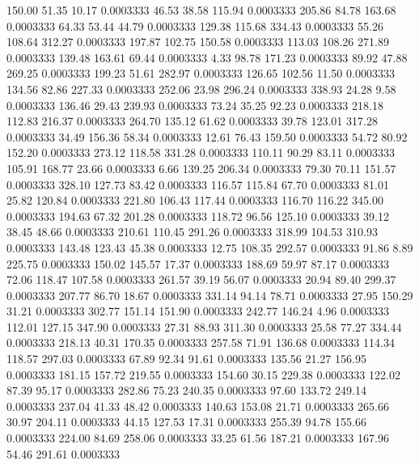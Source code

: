 150.00   51.35   10.17   0.0003333
  46.53   38.58  115.94   0.0003333
 205.86   84.78  163.68   0.0003333
  64.33   53.44   44.79   0.0003333
 129.38  115.68  334.43   0.0003333
  55.26  108.64  312.27   0.0003333
 197.87  102.75  150.58   0.0003333
 113.03  108.26  271.89   0.0003333
 139.48  163.61   69.44   0.0003333
   4.33   98.78  171.23   0.0003333
  89.92   47.88  269.25   0.0003333
 199.23   51.61  282.97   0.0003333
 126.65  102.56   11.50   0.0003333
 134.56   82.86  227.33   0.0003333
 252.06   23.98  296.24   0.0003333
 338.93   24.28    9.58   0.0003333
 136.46   29.43  239.93   0.0003333
  73.24   35.25   92.23   0.0003333
 218.18  112.83  216.37   0.0003333
 264.70  135.12   61.62   0.0003333
  39.78  123.01  317.28   0.0003333
  34.49  156.36   58.34   0.0003333
  12.61   76.43  159.50   0.0003333
  54.72   80.92  152.20   0.0003333
 273.12  118.58  331.28   0.0003333
 110.11   90.29   83.11   0.0003333
 105.91  168.77   23.66   0.0003333
   6.66  139.25  206.34   0.0003333
  79.30   70.11  151.57   0.0003333
 328.10  127.73   83.42   0.0003333
 116.57  115.84   67.70   0.0003333
  81.01   25.82  120.84   0.0003333
 221.80  106.43  117.44   0.0003333
 116.70  116.22  345.00   0.0003333
 194.63   67.32  201.28   0.0003333
 118.72   96.56  125.10   0.0003333
  39.12   38.45   48.66   0.0003333
 210.61  110.45  291.26   0.0003333
 318.99  104.53  310.93   0.0003333
 143.48  123.43   45.38   0.0003333
  12.75  108.35  292.57   0.0003333
  91.86    8.89  225.75   0.0003333
 150.02  145.57   17.37   0.0003333
 188.69   59.97   87.17   0.0003333
  72.06  118.47  107.58   0.0003333
 261.57   39.19   56.07   0.0003333
  20.94   89.40  299.37   0.0003333
 207.77   86.70   18.67   0.0003333
 331.14   94.14   78.71   0.0003333
  27.95  150.29   31.21   0.0003333
 302.77  151.14  151.90   0.0003333
 242.77  146.24    4.96   0.0003333
 112.01  127.15  347.90   0.0003333
  27.31   88.93  311.30   0.0003333
  25.58   77.27  334.44   0.0003333
 218.13   40.31  170.35   0.0003333
 257.58   71.91  136.68   0.0003333
 114.34  118.57  297.03   0.0003333
  67.89   92.34   91.61   0.0003333
 135.56   21.27  156.95   0.0003333
 181.15  157.72  219.55   0.0003333
 154.60   30.15  229.38   0.0003333
 122.02   87.39   95.17   0.0003333
 282.86   75.23  240.35   0.0003333
  97.60  133.72  249.14   0.0003333
 237.04   41.33   48.42   0.0003333
 140.63  153.08   21.71   0.0003333
 265.66   30.97  204.11   0.0003333
  44.15  127.53   17.31   0.0003333
 255.39   94.78  155.66   0.0003333
 224.00   84.69  258.06   0.0003333
  33.25   61.56  187.21   0.0003333
 167.96   54.46  291.61   0.0003333
